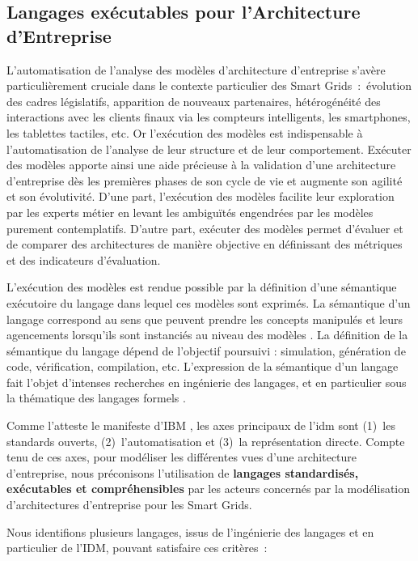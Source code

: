 \subsection{Langages exécutables pour l'Architecture d'Entreprise}

L'automatisation de l'analyse des modèles d'architecture d'entreprise s'avère particulièrement cruciale dans le contexte particulier des Smart Grids~:~évolution des cadres législatifs,  apparition de nouveaux partenaires, hétérogénéité des interactions avec les clients finaux via les compteurs intelligents, les smartphones, les tablettes tactiles, etc. Or l'exécution des modèles est indispensable à l'automatisation de l'analyse de leur structure et de leur comportement. Exécuter des modèles apporte ainsi une aide précieuse à la validation d'une architecture d'entreprise dès les premières phases de son cycle de vie et augmente son agilité et son évolutivité. D'une part, l'exécution des modèles facilite leur exploration  par les experts métier en levant les ambiguïtés engendrées par les modèles purement contemplatifs. D'autre part, exécuter des modèles permet d'évaluer et de comparer des architectures de manière objective en définissant des métriques et des indicateurs d'évaluation. 

L'exécution des modèles est rendue possible par la définition d'une sémantique exécutoire du langage dans lequel ces modèles sont exprimés. La sémantique d'un langage correspond au sens que peuvent prendre les concepts manipulés et leurs agencements lorsqu'ils sont instanciés au niveau des modèles \cite{jezequel2012ingenierie}. La définition de la sémantique du langage dépend de l'objectif poursuivi : simulation, génération de code, vérification, compilation, etc. L'expression de la sémantique d'un langage fait l'objet d'intenses recherches en ingénierie des langages, et en particulier sous la thématique des langages formels \cite{kleppe2007language}. 

Comme l'atteste le manifeste d'IBM \cite{chesbrough2006research}, les axes principaux de l'\gls{idm} sont (1)~les standards ouverts, (2)~l'automatisation et (3)~la représentation directe. Compte tenu de ces axes, pour modéliser les différentes vues d'une architecture d'entreprise, nous préconisons l'utilisation de \textbf{langages standardisés, exécutables et compréhensibles} par les acteurs concernés par la modélisation d'architectures d'entreprise pour les Smart Grids. 

Nous identifions plusieurs langages, issus de l'ingénierie des langages et en particulier de l'IDM, pouvant satisfaire ces critères~:

